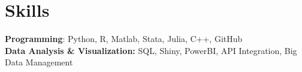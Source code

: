 \section{Skills}
\textbf{Programming}: Python, R, Matlab, Stata, Julia, C++, GitHub\\ %
\textbf{Data Analysis \& Visualization:} SQL, Shiny, PowerBI, API Integration, Big Data Management



